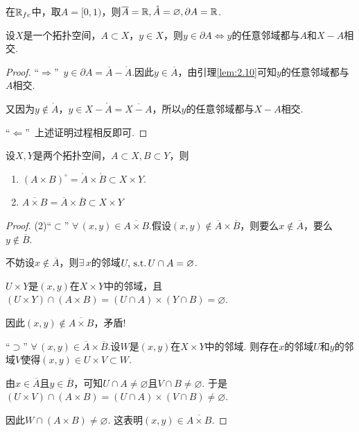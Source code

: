 \begin{instance}
    在$\mathbb{R}_{fc}$中，取$A=[0,1)$，则$\overline{A}=\mathbb{R},\mathring{A}=\varnothing,\partial A=\mathbb{R}$.
\end{instance}

\begin{lemma}
    设$X$是一个拓扑空间，$A\subset X$，$y\in X$，则$y\in\partial A\Leftrightarrow y$的任意邻域都与$A$和$X-A$相交.
\end{lemma}
\begin{proof}
    “$\Rightarrow$”\, $y\in\partial A=\overline{A}-\mathring{A}$.因此$y\in\overline{A}$，由引理\ref{lem:2.10}可知$y$的任意邻域都与$A$相交.\par
    又因为$y\notin\mathring{A}$，$y\in X-\mathring{A}=\overline{X-A}$，所以$y$的任意邻域都与$X-A$相交. \par
    “$\Leftarrow$”\, 上述证明过程相反即可.
\end{proof}



\begin{proposition}
    设$X,Y$是两个拓扑空间，$A\subset X,B\subset Y$，则
    \begin{enumerate}[(1)]
        \item $(A\times B)^\circ=\mathring{A}\times \mathring{B}\subset X\times Y$.
        \item $\overline{A\times B}=\overline{A}\times \overline{B}\subset X\times Y$
    \end{enumerate}
\end{proposition}
\begin{proof}
    (2)“$\subset$” $\forall\, (x,y)\in\overline{A\times B}$.假设$(x,y)\notin\overline{A}\times\overline{B}$，则要么$x\notin\overline{A}$，要么$y\notin\overline{B}$.\par
    不妨设$x\notin\overline{A}$，则$\exists\, x$的邻域$U,\operatorname{\,\text{s.t.}} U\cap A=\varnothing$.\par
    $U\times Y$是$(x,y)$在$X\times Y$中的邻域，且$(U\times Y)\cap(A\times B)=(U\cap A)\times (Y\cap B)=\varnothing$.\par
    因此$(x,y)\notin \overline{A\times B}$，矛盾! \par
    “$\supset$” $\forall\,(x,y)\in\overline{A}\times\overline{B}$.设$W$是$(x,y)$在$X\times Y$中的邻域. 则存在$x$的邻域$U$和$y$的邻域$V$使得$(x,y)\in U\times V\subset W$.\par
    由$x\in\overline{A}$且$y\in\overline{B}$，可知$U\cap A\neq\varnothing$且$V\cap B\neq\varnothing$. 于是$(U\times V)\cap(A\times B)=(U\cap A)\times(V\cap B)\neq\varnothing$.\par
    因此$W\cap(A\times B)\neq\varnothing$. 这表明$(x,y)\in\overline{A\times B}$.
\end{proof}











